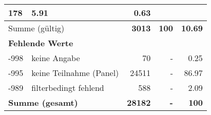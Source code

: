 \begin{longtable}{lXrrr}
       \num{178} &
       \num[round-mode=places,round-precision=2]{5,91} &
         \num[round-mode=places,round-precision=2]{0,63} \\
     \midrule
     \multicolumn{2}{l}{Summe (gültig)} &
       \textbf{\num{3013}} &
     \textbf{100} &
       \textbf{\num[round-mode=places,round-precision=2]{10,69}} \\
     \multicolumn{5}{l}{\textbf{Fehlende Werte}}\\
       -998 &
       keine Angabe &
         \num{70} &
        - &
         \num[round-mode=places,round-precision=2]{0,25} \\
       -995 &
       keine Teilnahme (Panel) &
         \num{24511} &
        - &
         \num[round-mode=places,round-precision=2]{86,97} \\
       -989 &
       filterbedingt fehlend &
         \num{588} &
        - &
         \num[round-mode=places,round-precision=2]{2,09} \\
     \midrule
     \multicolumn{2}{l}{\textbf{Summe (gesamt)}} &
          \textbf{\num{28182}} &
        \textbf{-} &
        \textbf{100} \\
     \bottomrule
     \end{longtable}
     
